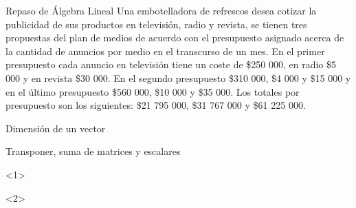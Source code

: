 \begin{frame}{Repaso de Álgebra Lineal}
  Una embotelladora de refrescos desea cotizar la publicidad de sus productos en televisión,
radio y revista, se tienen tres propuestas del plan de medios de acuerdo con el presupuesto
asignado acerca de la cantidad de anuncios por medio en el transcurso de un mes. En el
primer presupuesto cada anuncio en televisión tiene un coste de \$250 000, en radio \$5 000
y en revista \$30 000. En el segundo presupuesto \$310 000, \$4 000 y \$15 000 y en el último
presupuesto \$560 000, \$10 000 y \$35 000. Los totales por presupuesto son los siguientes:
\$21 795 000, \$31 767 000 y \$61 225 000.
\end{frame}

\begin{frame}{Dimensión de un vector}
  
  
\end{frame}



\begin{frame}[t]{Transponer, suma de matrices y escalares}
  \begin{onlyenv}<1>
      
    \end{onlyenv}

    \begin{onlyenv}<2>
            
    \end{onlyenv}
  \end{frame}

  
